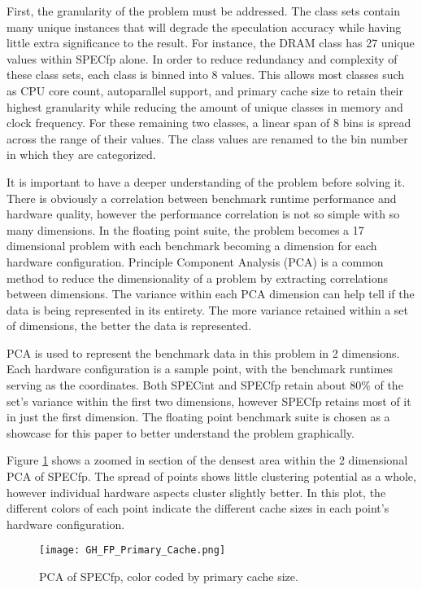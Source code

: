 \documentclass[10pt,twocolumn,letterpaper]{article}
\begin{document}
First, the granularity of the problem must be addressed.
The class sets contain many unique instances that will degrade the speculation accuracy while having little extra significance to the result.
For instance, the DRAM class has 27 unique values within SPECfp alone.
In order to reduce redundancy and complexity of these class sets, each class is binned into 8 values.
This allows most classes such as CPU core count, autoparallel support, and primary cache size to retain their highest granularity while reducing the amount of unique classes in memory and clock frequency.
For these remaining two classes, a linear span of 8 bins is spread across the range of their values.
The class values are renamed to the bin number in which they are categorized.

It is important to have a deeper understanding of the problem before solving it.
There is obviously a correlation between benchmark runtime performance and hardware quality, however the performance correlation is not so simple with so many dimensions.
In the floating point suite, the problem becomes a 17 dimensional problem with each benchmark becoming a dimension for each hardware configuration.
Principle Component Analysis (PCA) is a common method to reduce the dimensionality of a problem by extracting correlations between dimensions.
The variance within each PCA dimension can help tell if the data is being represented in its entirety.
The more variance retained within a set of dimensions, the better the data is represented.

PCA is used to represent the benchmark data in this problem in 2 dimensions.
Each hardware configuration is a sample point, with the benchmark runtimes serving as the coordinates.
Both SPECint and SPECfp retain about 80\% of the set’s variance within the first two dimensions, however SPECfp retains most of it in just the first dimension.
The floating point benchmark suite is chosen as a showcase for this paper to better understand the problem graphically.

Figure \ref{fig:fpPrimCache} shows a zoomed in section of the densest area within the 2 dimensional PCA of SPECfp.
The spread of points shows little clustering potential as a whole, however individual hardware aspects cluster slightly better.
In this plot, the different colors of each point indicate the different cache sizes in each point’s hardware configuration.

\begin{figure}[t]
\centering
\texttt{[image: GH\_FP\_Primary\_Cache.png]}
\caption{PCA of SPECfp, color coded by primary cache size.}
\label{fig:fpPrimCache}
\end{figure}
\end{document}
